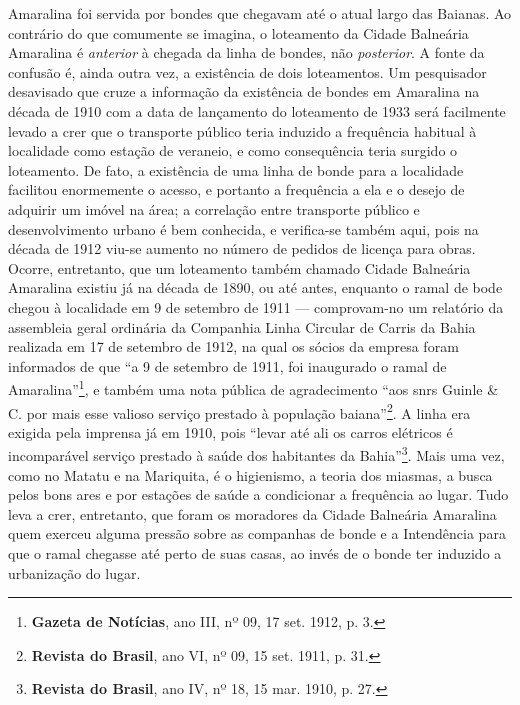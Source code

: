 Amaralina foi servida por bondes que chegavam até o atual largo das Baianas. Ao contrário do que comumente se imagina, o loteamento da Cidade Balneária Amaralina é \textit{anterior} à chegada da linha de bondes, não \textit{posterior}. A fonte da confusão é, ainda outra vez, a existência de dois loteamentos. Um pesquisador desavisado que cruze a informação da existência de bondes em Amaralina na década de 1910 com a data de lançamento do loteamento de 1933 será facilmente levado a crer que o transporte público teria induzido a frequência habitual à localidade como estação de veraneio, e como consequência teria surgido o loteamento. De fato, a existência de uma linha de bonde para a localidade facilitou enormemente o acesso, e portanto a frequência a ela e o desejo de adquirir um imóvel na área; a correlação entre transporte público e desenvolvimento urbano é bem conhecida, e verifica-se também aqui, pois na década de 1912 viu-se aumento no número de pedidos de licença para obras. Ocorre, entretanto, que um loteamento também chamado Cidade Balneária Amaralina existiu já na década de 1890, ou até antes, enquanto o ramal de bode chegou à localidade em 9 de setembro de 1911 --- comprovam-no um relatório da assembleia geral ordinária da Companhia Linha Circular de Carris da Bahia realizada em 17 de setembro de 1912, na qual os sócios da empresa foram informados de que ``a 9 de setembro de 1911, foi inaugurado o ramal de Amaralina''\footnote{\textbf{Gazeta de Notícias}, ano III, nº 09, 17 set. 1912, p. 3.}, e também uma nota pública de agradecimento ``aos snrs Guinle \& C. por mais esse valioso serviço prestado à população baiana''\footnote{\textbf{Revista do Brasil}, ano VI, nº 09, 15 set. 1911, p. 31.}. A linha era exigida pela imprensa já em 1910, pois ``levar até ali os carros elétricos é incomparável serviço prestado à saúde dos habitantes da Bahia''\footnote{\textbf{Revista do Brasil}, ano IV, nº 18, 15 mar. 1910, p. 27.}. Mais uma vez, como no Matatu e na Mariquita, é o higienismo, a teoria dos miasmas, a busca pelos bons ares e por estações de saúde a condicionar a frequência ao lugar. Tudo leva a crer, entretanto, que foram os moradores da Cidade Balneária Amaralina quem exerceu alguma pressão sobre as companhas de bonde e a Intendência para que o ramal chegasse até perto de suas casas, ao invés de o bonde ter induzido a urbanização do lugar.





